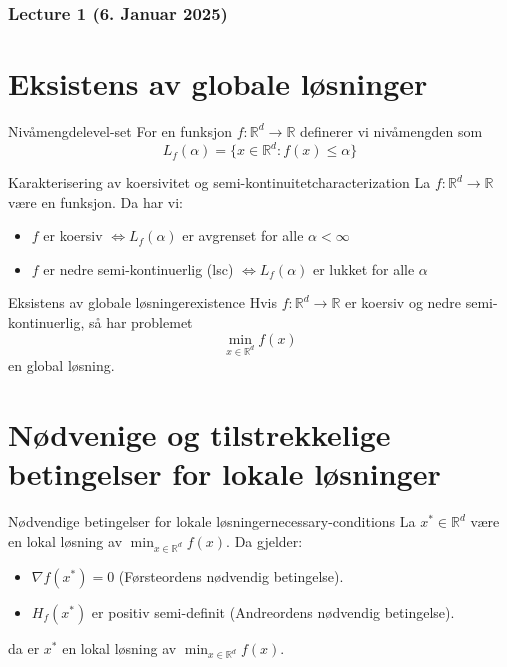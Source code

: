 \subsubsection{Lecture 1 (6. Januar 2025)}

\section*{Eksistens av globale løsninger}

\begin{definition}{Nivåmengde}{level-set}
For en funksjon $f: \mathbb{R}^d \to \mathbb{R}$ definerer vi nivåmengden som
\[
L_f(\alpha) = \{x \in \mathbb{R}^d : f(x) \leq \alpha\}
\]
\end{definition}

\begin{theorem}{Karakterisering av koersivitet og semi-kontinuitet}{characterization}
La $f: \mathbb{R}^d \to \mathbb{R}$ være en funksjon. Da har vi:
\begin{itemize}
    \item $f$ er koersiv $\iff L_f(\alpha)$ er avgrenset for alle $\alpha < \infty$
    \item $f$ er nedre semi-kontinuerlig (lsc) $\iff L_f(\alpha)$ er lukket for alle $\alpha$
\end{itemize}
\end{theorem}

\begin{theorem}{Eksistens av globale løsninger}{existence}
Hvis $f: \mathbb{R}^d \to \mathbb{R}$ er koersiv og nedre semi-kontinuerlig, så har problemet
\[
\min_{x \in \mathbb{R}^d} f(x)
\]
en global løsning.
\end{theorem}

\section*{Nødvenige og tilstrekkelige betingelser for lokale løsninger}

\begin{theorem}{Nødvendige betingelser for lokale løsninger}{necessary-conditions}
La $x^* \in \mathbb{R}^d$ være en lokal løsning av $\min_{x \in \mathbb{R}^d} f(x)$. Da gjelder:
\begin{itemize}
    \item $\nabla f(x^*) = 0$ (Førsteordens nødvendig betingelse).
    \item $H_f(x^*)$ er positiv semi-definit (Andreordens nødvendig betingelse).
\end{itemize}
da er $x^*$ en lokal løsning av $\min_{x \in \mathbb{R}^d} f(x)$.
\end{theorem}\label{thm:necessary-conditions}


